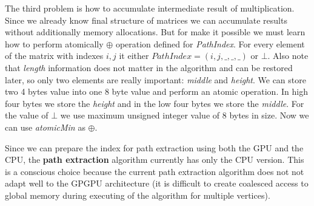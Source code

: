 The third problem is how to accumulate intermediate result of multiplication. Since we already know final structure of matrices we can accumulate results without additionally memory allocations. But for make it possible we must learn how to perform atomically $\oplus$ operation defined for \textit{PathIndex}. For every element of the matrix with indexes $i,j$ it either $PathIndex = (i,j,\_,\_,\_)$ or $\bot$. Also note that \textit{length} information does not matter in the algorithm and can be restored later, so only two elements are really important: \textit{middle} and \textit{height}. We can store two 4 bytes value into one 8 byte value and perform an atomic operation. In high four bytes we store the \textit{height} and in the low four bytes we store the \textit{middle}. For the value of $\bot$ we use maximum unsigned integer value of 8 bytes in size. Now we can use \textit{atomicMin} as $\oplus$.

Since we can prepare the index for path extraction using both the GPU and the CPU, the \textbf{path extraction} algorithm currently has only the CPU version. This is a conscious choice because the current path extraction algorithm does not not adapt well to the GPGPU architecture (it is difficult to create coalesced access to global memory during executing of the algorithm for multiple vertices).
